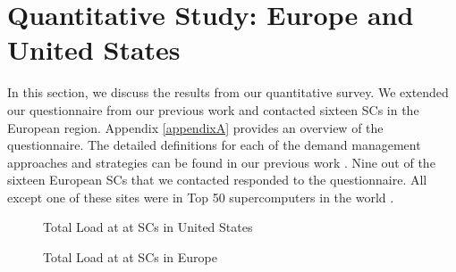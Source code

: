\section{Quantitative Study: Europe and United States}
\label{res}
In this section, we discuss the results from our quantitative survey. We extended our questionnaire from our previous work \cite{BatesESP} and contacted sixteen SCs in the European region.  Appendix \ref{appendixA} provides an overview of the questionnaire. The detailed definitions for each of the demand management approaches and strategies can be found in our previous work \cite{BatesESP}. Nine out of the sixteen European SCs that we contacted responded to the questionnaire. All except one of these sites were in Top 50 supercomputers in the world \cite{Top500}. 


\begin{figure}[ht!]
\begin{center}
\caption{Total Load at at SCs in United States}
\label{fig:USload}
\vspace{0.9cm}
\caption{Total Load at at SCs in Europe}
\label{fig:EUload}
\end{center}
\end{figure}

